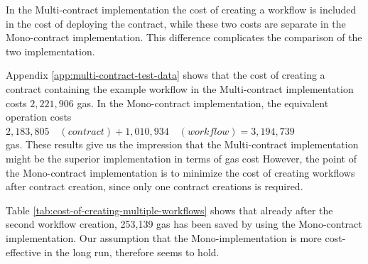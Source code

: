 \documentclass{article}
\begin{document}
	In the Multi-contract implementation the cost of creating a workflow is included in the cost of deploying the contract, while these two costs are separate in the Mono-contract implementation.
	This difference complicates the comparison of the two implementation.

	Appendix \ref{app:multi-contract-test-data} shows that the cost of creating a contract containing the example workflow in the Multi-contract implementation costs $2,221,906$ gas.
	In the Mono-contract implementation, the equivalent operation costs \\

	$2,183,805\quad(contract) + 1,010,934\quad(workflow) = 3,194,739$ \\

	\noindent gas. These results give us the impression that the Multi-contract implementation might be the superior implementation in terms of gas cost
	However, the point of the Mono-contract implementation is to minimize the cost of creating workflows after contract creation, since only one contract creations is required. 

	Table \ref{tab:cost-of-creating-multiple-workflows} shows that already after the second workflow creation, 253,139 gas has been saved by using the Mono-contract implementation.
	Our assumption that the Mono-implementation is more cost-effective in the long run, therefore seems to hold.  
\end{document}
